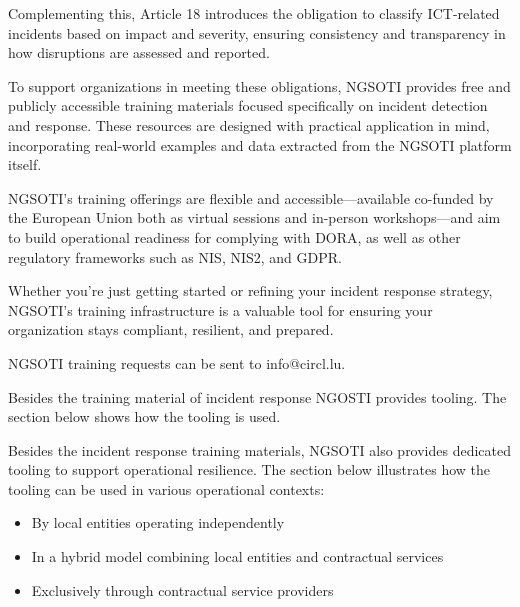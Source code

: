\documentclass[10pt,a4paper]{report}
\begin{document}
Complementing this, Article 18 introduces the obligation to classify
ICT-related incidents based on impact and severity, ensuring consistency and
transparency in how disruptions are assessed and reported.

To support organizations in meeting these obligations, NGSOTI provides free
and publicly accessible training materials focused specifically on incident
detection and response. These resources are designed with practical application
in mind, incorporating real-world examples and data extracted from the NGSOTI
platform itself.

NGSOTI’s training offerings are flexible and accessible—available co-funded by
the European Union both as virtual sessions and in-person workshops—and aim
to build operational readiness for complying with DORA, as well as other
regulatory frameworks such as NIS, NIS2, and GDPR.

Whether you're just getting started or refining your incident response
strategy, NGSOTI’s training infrastructure is a valuable tool for ensuring
your organization stays compliant, resilient, and prepared.

NGSOTI training requests can be sent to info@circl.lu.


Besides the training material of incident response  NGOSTI provides tooling.
The section below shows how the tooling is used.

Besides the incident response training materials, NGSOTI also provides
dedicated tooling to support operational resilience.
The section below illustrates how the tooling can be used in various
operational contexts:

\begin{itemize}
    \item By local entities operating independently
    \item In a hybrid model combining local entities and contractual services
    \item Exclusively through contractual service providers
\end{itemize}
\end{document}
